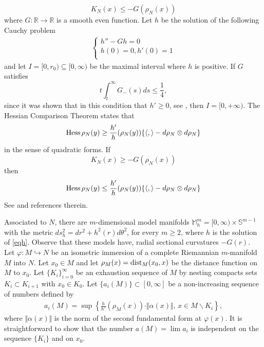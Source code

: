 \documentclass[a4paper]{amsart}
\theoremstyle{definition}
\numberwithin{equation}{section}
\begin{document}
\begin{equation}
\label{eqCurv}K_{N}(x)\leq - G(\rho_{N}(x))
\end{equation}
where $G\colon\mathbb{R}\rightarrow\mathbb{R}$ is a smooth
even function. Let $h$ be the solution of the following Cauchy problem
\begin{eqnarray}\label{eqh}
\left \{
\begin{array}{l}
h'' -Gh=0 \\
h(0)=0, h'(0)=1\\
\end{array} \right.
\end{eqnarray}
and let $I=[0,r_{0})\subseteq [0,\infty)$ be the maximal interval where $h$ is positive. If $G$ satisfies 
\begin{equation}\label{eqBMR-memoirs} t\int_{t}^{\infty}G_{-}(s)ds
\leq \frac{1}{4},
\end{equation} since it was shown that in this condition that
$h'\geq 0$, see \cite[Prop. 1.21]{bmr}, then $I=[0, +\infty)$. The Hessian Comparison Theorem states that \begin{equation}\label{eqBF6}
{\rm{\textrm{Hess}}}\, \rho_{N}(y)\geq \displaystyle\frac{h'}{h}(\rho_{N}(y))\{ \langle,\rangle - d\rho_{N}\otimes d\rho_{N}\}
\end{equation} in the sense of quadratic forms. If
\[
K_{N}(x)\geq -G(\rho_N(x))
\]
 then
\begin{equation}\label{eqBF6-b}
{\rm{\textrm{Hess}}}\, \rho_{N}(y)\leq \displaystyle\frac{h'}{h}(\rho_{N}(y))\{ \langle,\rangle - d\rho_{N}\otimes d\rho_{N}\}
\end{equation}See   \cite{PRS} and references therein.
 
 Associated to $N$, there are  $m$-dimensional model manifolds  $\mathbb{M}_{h}^{m} =  [0,\infty)  \times\mathbb{S}^{m-1}$ with  the metric $ds^{2}_{h}=dr^2+h^{2}\left(r\right)d\theta^{2} $, for every $m\geq 2$, where $h$ is the solution of \eqref{eqh}. Observe that these models have, 
radial sectional curvatures $-G\left(  r\right)  $. Let   $\varphi \colon M \hookrightarrow N$ be an isometric immersion  of a complete Riemannian $m$-manifold $M$ into  $N$. Let $x_0 \in M$ and let $\rho_{M} (x) = {\rm dist}_{M}(x_0, x)$ be the  distance function on $M$ to $x_0$.
Let $\{K_i\}_{i=0}^{\infty}$ be an exhaustion sequence of $M$ by nesting
compacts sets $K_i\subset K_{i+1}$ with $x_0 \in K_0$. Let $\{a_{i}(M)\}\subset [0,\infty]$ be a non-increasing
sequence of numbers defined  by
\[
\begin{array}{ccl}
a_i(M) = \sup \left \{ \displaystyle
\frac{h}{h'}(\rho_{M} (x))\cdot
\Vert \alpha (x)\Vert, \, x \in M \backslash K_i \right \},
\end{array}
\]
where $\Vert \alpha(x)\Vert $ is the  norm of the second fundamental form at $\varphi(x)$.
It is straightforward to show that the number  $a(M)=\displaystyle\lim a_i$ is independent on the sequence $\{K_{i}\}$ and on  $x_{0}$.
\end{document}
